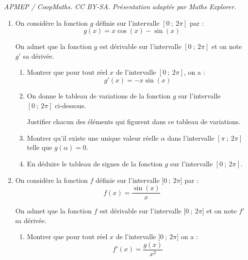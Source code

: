 \documentclass[10pt]{article}
\begin{document}
\noindent\textit{APMEP / CoopMaths. CC BY-SA. Présentation adaptée par Maths Explorer.}\par\medskip
\begin{enumerate}
\item On considère la fonction $g$ définie sur l'intervalle $[0~;~2\pi]$ par :
\[
g(x)=x\cos(x)-\sin(x)
\]

On admet que la fonction $g$ est dérivable sur l'intervalle $[0~;~2\pi]$ et on note $g'$ sa dérivée.

\begin{enumerate}
\item Montrer que pour tout réel $x$ de l'intervalle $[0~;~2\pi]$, on a :
\[
g'(x)=-x\sin(x)
\]

\item On donne le tableau de variations de la fonction $g$ sur l'intervalle $[0~;~2\pi]$ ci-dessous.

Justifier chacun des éléments qui figurent dans ce tableau de variations.

\begin{center}
\end{center}

\item Montrer qu'il existe une unique valeur réelle $\alpha$ dans l'intervalle $[\pi~;~2\pi]$ telle que $g(\alpha)=0$.

\item En déduire le tableau de signes de la fonction $g$ sur l'intervalle $[0~;~2\pi]$.
\end{enumerate}

\item On considère la fonction $f$ définie sur l'intervalle $]0~;~2\pi]$ par :
\[
f(x)=\dfrac{\sin(x)}{x}
\]

On admet que la fonction $f$ est dérivable sur l'intervalle $]0~;~2\pi]$ et on note $f'$ sa dérivée.

\begin{enumerate}
\item Montrer que pour tout réel $x$ de l'intervalle $]0~;~2\pi]$ on a :
\[
f'(x)=\dfrac{g(x)}{x^2}
\]


\end{enumerate}
\end{enumerate}
\end{document}

